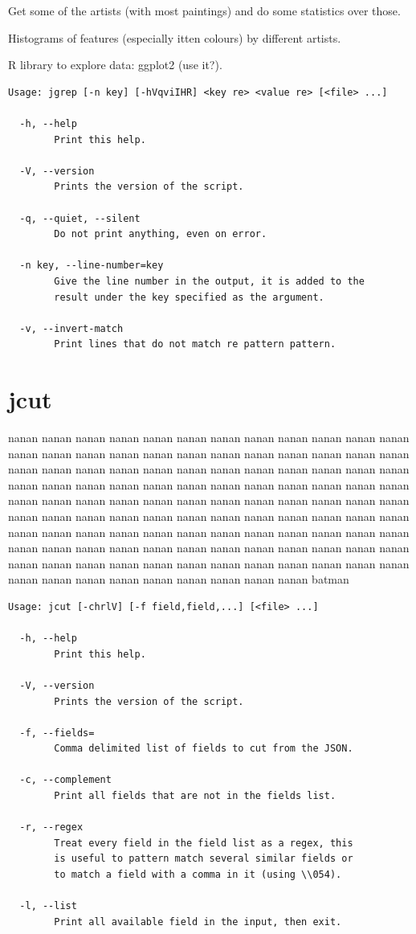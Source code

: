 \documentclass[11pt,a4paper,draft]{report}
\begin{document}
Get some of the artists (with most paintings) and do some statistics over
those.

Histograms of features (especially itten colours) by different artists.

R library to explore data: ggplot2 (use it?).

{\small
\begin{Verbatim}[samepage=true]
Usage: jgrep [-n key] [-hVqviIHR] <key re> <value re> [<file> ...]

  -h, --help
        Print this help.

  -V, --version
        Prints the version of the script.

  -q, --quiet, --silent
        Do not print anything, even on error.

  -n key, --line-number=key
        Give the line number in the output, it is added to the
        result under the key specified as the argument.

  -v, --invert-match
        Print lines that do not match re pattern pattern.
\end{Verbatim}
}

\section{jcut}

nanan nanan nanan nanan nanan nanan nanan nanan nanan nanan nanan nanan nanan
nanan nanan nanan nanan nanan nanan nanan nanan nanan nanan nanan nanan nanan
nanan nanan nanan nanan nanan nanan nanan nanan nanan nanan nanan nanan nanan
nanan nanan nanan nanan nanan nanan nanan nanan nanan nanan nanan nanan nanan
nanan nanan nanan nanan nanan nanan nanan nanan nanan nanan nanan nanan nanan
nanan nanan nanan nanan nanan nanan nanan nanan nanan nanan nanan nanan nanan
nanan nanan nanan nanan nanan nanan nanan nanan nanan nanan nanan nanan nanan
nanan nanan nanan nanan nanan nanan nanan nanan nanan nanan nanan nanan nanan
nanan nanan nanan nanan nanan nanan nanan nanan nanan nanan nanan nanan nanan
batman

{\small
\begin{Verbatim}[samepage=true]
Usage: jcut [-chrlV] [-f field,field,...] [<file> ...]

  -h, --help
        Print this help.

  -V, --version
        Prints the version of the script.

  -f, --fields=
        Comma delimited list of fields to cut from the JSON.

  -c, --complement
        Print all fields that are not in the fields list.

  -r, --regex
        Treat every field in the field list as a regex, this
        is useful to pattern match several similar fields or
        to match a field with a comma in it (using \\054).

  -l, --list
        Print all available field in the input, then exit.
\end{Verbatim}
}
\end{document}
